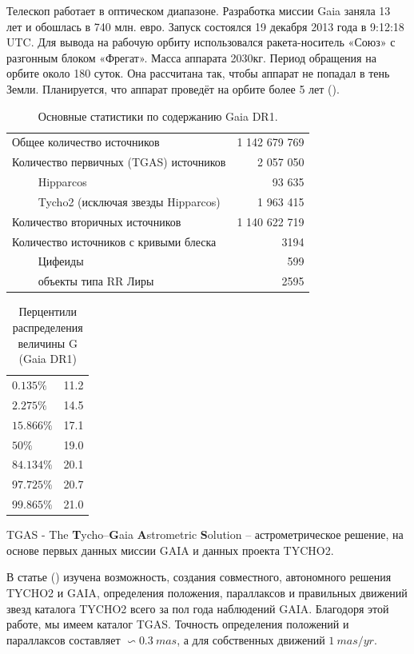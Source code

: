 \documentclass[14pt]{article} %
\begin{document}
Телескоп работает в оптическом диапазоне. Разработка миссии Gaia заняла 13 лет и обошлась в 740 млн. евро.
Запуск состоялся 19 декабря 2013 года в 9:12:18 UTC. Для вывода на рабочую орбиту использовался ракета-носитель «Союз» с разгонным блоком «Фрегат». Масса аппарата 2030кг. Период обращения на орбите около 180 суток. Она рассчитана так, чтобы аппарат не попадал в тень Земли. Планируется, что аппарат проведёт на орбите более 5 лет (\cite{wiki:gaia}).

\begin{table}[h!]
\centering
\caption{Основные статистики по содержанию Gaia DR1.}
\label{tabular:gaia_dr1}
\begin{tabular}{|l|r|}
\hline 	
Общее количество источников & 1 142 679 769\\
Количество первичных (TGAS) источников & 2 057 050\\
$\qquad$ Hipparcos & 93 635\\
$\qquad$ Tycho2 (исключая звезды Hipparcos) & 1 963 415\\
Количество вторичных источников  & 1 140 622 719\\	
Количество источников с кривыми блеска & 3194\\
$\qquad$ Цифеиды & 599\\
$\qquad$ объекты типа RR Лиры & 2595\\
\hline 	
\end{tabular}
\end{table}

\begin{table}[h!]
\centering
\caption{Перцентили распределения величины G (Gaia DR1)}
\label{tabular:gaia_dr1}
\begin{tabular}{|l|r|}
\hline 	
$0.135\%$ &11.2\\
$2.275\%$&14.5\\
$15.866\%$&	17.1\\
$50\%$&19.0\\
$84.134\%$&20.1\\
$97.725\%$&	20.7\\
$99.865\%$&	21.0\\
\hline 	
\end{tabular}
\end{table}


TGAS - The \textbf{T}ycho–\textbf{G}aia \textbf{A}strometric \textbf{S}olution -- астрометрическое решение, на основе первых данных миссии GAIA и данных проекта TYCHO2. 

В статье (\cite{book:tgasar}) изучена возможность, создания совместного, автономного решения TYCHO2 и GAIA, определения положения, параллаксов и правильных движений звезд каталога TYCHO2 всего за пол года наблюдений GAIA. Благодоря этой работе, мы имеем каталог TGAS.
Точность определения положений и параллаксов составляет $\backsim 0.3~mas$, а для собственных движений  $1~mas/yr$.
\end{document}
